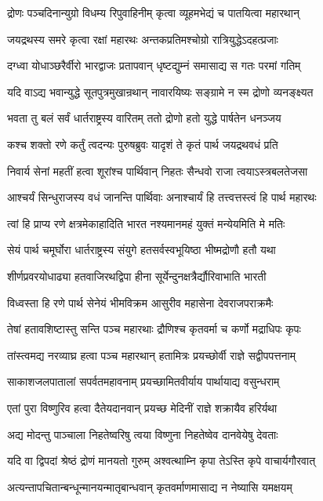 \twolineshloka
{द्रोणः पञ्चदिनान्युग्रो विधम्य रिपुवाहिनीम्}
{कृत्वा व्यूहमभेद्यं च पातयित्वा महारथान्}


\twolineshloka
{जयद्रथस्य समरे कृत्वा रक्षां महारथः}
{अन्तकप्रतिमश्चोग्रो रात्रियुद्धेऽदहत्प्रजाः}


\twolineshloka
{दग्ध्वा योधाञ्छरैर्वीरो भारद्वाजः प्रतापवान्}
{धृष्टद्युम्नं समासाद्य स गतः परमां गतिम्}


\twolineshloka
{यदि वाऽद्य भवान्युद्धे सूतपुत्रमुखान्रथान्}
{नावारयिष्यः सङ्ग्रामे न स्म द्रोणो व्यनङ्क्ष्यत}


\twolineshloka
{भवता तु बलं सर्वं धार्तराष्ट्रस्य वारितम्}
{ततो द्रोणो हतो युद्धे पार्षतेन धनञ्जय}


\twolineshloka
{कश्च शक्तो रणे कर्तुं त्वदन्यः पुरुषब्रुवः}
{यादृशं ते कृतं पार्थ जयद्रथवधं प्रति}


\twolineshloka
{निवार्य सेनां महतीं हत्वा शूरांश्च पार्थिवान्}
{निहतः सैन्धवो राजा त्वयाऽस्त्रबलतेजसा}


\twolineshloka
{आश्चर्यं सिन्धुराजस्य वधं जानन्ति पार्थिवाः}
{अनाश्चार्यं हि तत्त्वत्तस्त्वं हि पार्थ महारथः}


\twolineshloka
{त्वां हि प्राप्य रणे क्षत्रमेकाहादिति भारत}
{नश्यमानमहं युक्तं मन्येयमिति मे मतिः}


\twolineshloka
{सेयं पार्थ चमूर्घोरा धार्तराष्ट्रस्य संयुगे}
{हतसर्वस्वभूयिष्ठा भीष्मद्रोणौ हतौ यथा}


\twolineshloka
{शीर्णप्रवरयोधाढ्या हतवाजिरथद्विपा}
{हीना सूर्येन्दुनक्षत्रैर्द्यौरिवाभाति भारती}


\twolineshloka
{विध्वस्ता हि रणे पार्थ सेनेयं भीमविक्रम}
{आसुरीव महासेना देवराजपराक्रमैः}


\twolineshloka
{तेषां हतावशिष्टास्तु सन्ति पञ्च महारथाः}
{द्रौणिश्च कृतवर्मा च कर्णो मद्राधिपः कृपः}


\twolineshloka
{तांस्त्वमद्य नरव्याघ्र हत्वा पञ्च महारथान्}
{हतामित्रः प्रयच्छोर्वी राज्ञे सद्वीपपत्तनाम्}


\twolineshloka
{साकाशजलपातालां सपर्वतमहावनाम्}
{प्रयच्छामितवीर्याय पार्थायाद्य वसुन्धराम्}


\twolineshloka
{एतां पुरा विष्णुरिव हत्वा दैतेयदानवान्}
{प्रयच्छ मेदिनीं राज्ञे शक्रायैव हरिर्यथा}


\twolineshloka
{अद्य मोदन्तु पाञ्चाला निहतेष्वरिषु त्वया}
{विष्णुना निहतेष्वेव दानवेयेषु देवताः}


\twolineshloka
{यदि वा द्विपदां श्रेष्ठं द्रोणं मानयतो गुरुम्}
{अश्वत्थाम्नि कृपा तेऽस्ति कृपे वाचार्यगौरवात्}


\twolineshloka
{अत्यन्तापचितान्बन्धून्मानयन्मातृबान्धवान्}
{कृतवर्माणमासाद्य न नेष्यासि यमक्षयम्}


